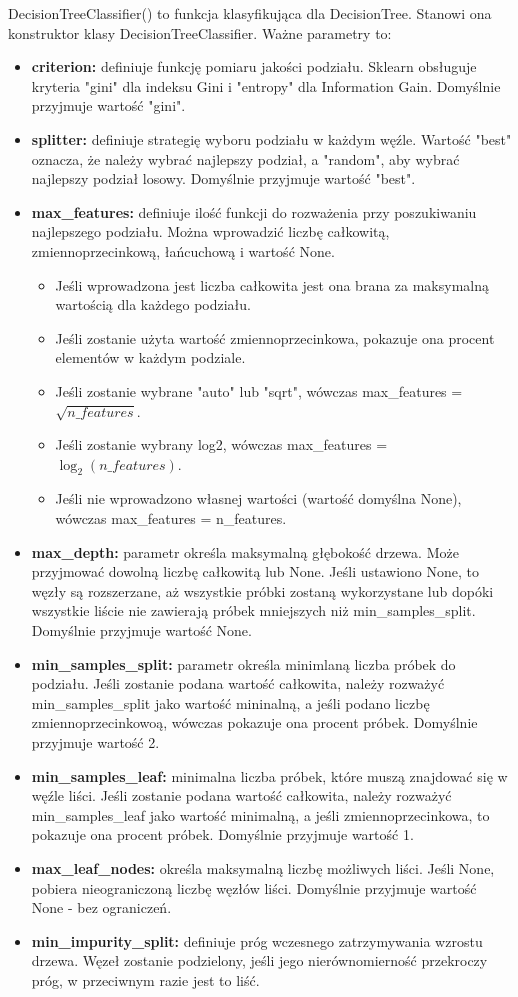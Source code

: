 \documentclass[10pt,a4paper]{article}
\begin{document}
DecisionTreeClassifier() to funkcja klasyfikująca dla DecisionTree. Stanowi ona konstruktor klasy DecisionTreeClassifier. Ważne parametry to:
\begin{itemize}
	\item \textbf{criterion:} definiuje funkcję pomiaru jakości podziału. Sklearn obsługuje kryteria "gini" dla indeksu Gini i "entropy" dla Information Gain. Domyślnie przyjmuje wartość "gini".
	\item \textbf{splitter:} definiuje strategię wyboru podziału w każdym węźle. Wartość "best" oznacza, że należy wybrać najlepszy podział, a "random", aby wybrać najlepszy podział losowy. Domyślnie przyjmuje wartość "best".
	\item \textbf{max\_features:} definiuje ilość funkcji do rozważenia przy poszukiwaniu najlepszego podziału. Można wprowadzić liczbę całkowitą, zmiennoprzecinkową, łańcuchową i wartość None.
	\begin{itemize}
		\item Jeśli wprowadzona jest liczba całkowita jest ona brana za maksymalną wartością dla każdego podziału.
		\item Jeśli zostanie użyta wartość zmiennoprzecinkowa, pokazuje ona procent elementów w każdym podziale.
		\item Jeśli zostanie wybrane "auto" lub "sqrt", wówczas max\_features = $\sqrt{n\_features}$.
		\item Jeśli zostanie wybrany log2, wówczas max\_features = $\log_2{(n\_features)}$.
		\item Jeśli nie wprowadzono własnej wartości (wartość domyślna None), wówczas max\_features = n\_features.
	\end{itemize}

	\item \textbf{max\_depth:} parametr określa maksymalną głębokość drzewa. Może przyjmować dowolną liczbę całkowitą lub None. Jeśli ustawiono None, to węzły są rozszerzane, aż wszystkie próbki zostaną wykorzystane lub dopóki wszystkie liście nie zawierają próbek mniejszych niż min\_samples\_split. Domyślnie przyjmuje wartość None.
	\item \textbf{min\_samples\_split:} parametr określa minimlaną liczba próbek do podziału. Jeśli zostanie podana wartość całkowita, należy rozważyć min\_samples\_split jako wartość mininalną, a jeśli podano liczbę zmiennoprzecinkowoą, wówczas pokazuje ona procent próbek. Domyślnie przyjmuje wartość 2.
	\item \textbf{min\_samples\_leaf:} minimalna liczba próbek, które muszą znajdować się w węźle liści. Jeśli zostanie podana wartość całkowita, należy rozważyć min\_samples\_leaf jako wartość minimalną, a jeśli zmiennoprzecinkowa, to pokazuje ona procent próbek. Domyślnie przyjmuje wartość 1.
	\item \textbf{max\_leaf\_nodes:} określa maksymalną liczbę możliwych liści. Jeśli None, pobiera nieograniczoną liczbę węzłów liści. Domyślnie przyjmuje wartość None - bez ograniczeń.
	\item \textbf{min\_impurity\_split:} definiuje próg wczesnego zatrzymywania wzrostu drzewa. Węzeł zostanie podzielony, jeśli jego nierównomierność przekroczy próg, w przeciwnym razie jest to liść.
\end{itemize}
\end{document}
